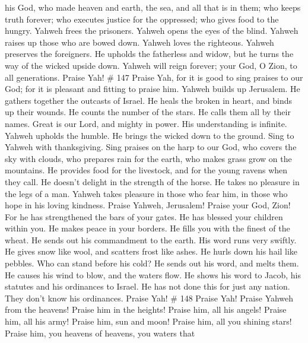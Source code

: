 his God,  who made heaven and earth, the sea, and all that
is in them; who keeps truth forever;  who executes justice
for the oppressed; who gives food to the hungry. Yahweh frees the
prisoners.  Yahweh opens the eyes of the blind. Yahweh
raises up those who are bowed down. Yahweh loves the righteous.
 Yahweh preserves the foreigners. He upholds the fatherless
and widow, but he turns the way of the wicked upside down. 
Yahweh will reign forever; your God, O Zion, to all generations. Praise
Yah! \# 147  Praise Yah, for it is good to sing praises to
our God; for it is pleasant and fitting to praise him. 
Yahweh builds up Jerusalem. He gathers together the outcasts of Israel.
 He heals the broken in heart, and binds up their wounds.
 He counts the number of the stars. He calls them all by
their names.  Great is our Lord, and mighty in power. His
understanding is infinite.  Yahweh upholds the humble. He
brings the wicked down to the ground.  Sing to Yahweh with
thanksgiving. Sing praises on the harp to our God,  who
covers the sky with clouds, who prepares rain for the earth, who makes
grass grow on the mountains.  He provides food for the
livestock, and for the young ravens when they call.  He
doesn't delight in the strength of the horse. He takes no pleasure in
the legs of a man.  Yahweh takes pleasure in those who fear
him, in those who hope in his loving kindness.  Praise
Yahweh, Jerusalem! Praise your God, Zion!  For he has
strengthened the bars of your gates. He has blessed your children within
you.  He makes peace in your borders. He fills you with the
finest of the wheat.  He sends out his commandment to the
earth. His word runs very swiftly.  He gives snow like
wool, and scatters frost like ashes.  He hurls down his
hail like pebbles. Who can stand before his cold?  He sends
out his word, and melts them. He causes his wind to blow, and the waters
flow.  He shows his word to Jacob, his statutes and his
ordinances to Israel.  He has not done this for just any
nation. They don't know his ordinances. Praise Yah! \# 148 
Praise Yah! Praise Yahweh from the heavens! Praise him in the heights!
 Praise him, all his angels! Praise him, all his army!
 Praise him, sun and moon! Praise him, all you shining
stars!  Praise him, you heavens of heavens, you waters that
